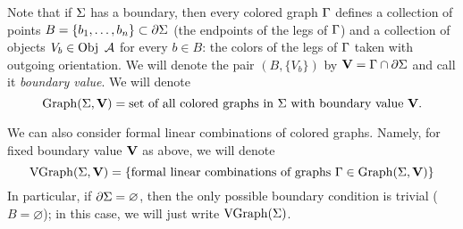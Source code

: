 
Note that if $\Sigma$ has a boundary, then every colored graph $\Gamma$ defines
a collection of points $B=\{b_1,\dots, b_n\}\subset \partial \Sigma$ (the
endpoints of the legs of $\Gamma$) and a collection of objects $V_b\in \operatorname{Obj}\
\mathcal{A}$ for every $b \in B$: the colors of the legs of $\Gamma$ taken with
outgoing orientation. We will denote the pair $(B, \{V_b\})$ by
$\mathbf{V}=\Gamma\cap \partial\Sigma$ and call it {\em boundary value}. We will denote  
$$
\operatorname{Graph}(\Sigma, \mathbf{V})=\text{set of all colored graphs in $\Sigma$ with boundary value
} \mathbf{V}.
$$ 


We can also consider formal linear combinations of colored graphs. Namely,
for fixed boundary value $\mathbf{V}$ as above, we will denote 
\begin{equation*}\label{e:vgr}
\operatorname{VGraph}(\Sigma,\mathbf{V})=\{\text{formal linear combinations of graphs }\Gamma\in
\operatorname{Graph}(\Sigma,\mathbf{V})\}
\end{equation*}
In particular, if $\partial \Sigma=\varnothing$, then the only possible boundary
condition is trivial ($B=\varnothing$); in this case, we will just write
$\operatorname{VGraph}(\Sigma)$. 



